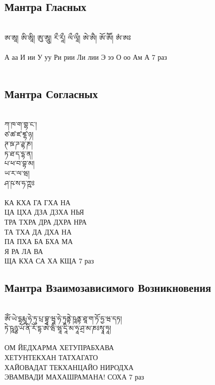 \subsection*{Мантра Гласных}
\\
\ti
ཨ་ཨཱ། ཨི་ཨཱི། ཨུ་ཨཱུ། རྀ་རཱྀ། ལྀ་ལཱྀ། ཨེ་ཨཻ། ཨོ་ཨཽ། ཨཾ་ཨཿ\\
\\
\ru
А аа И ии У уу Ри рии Ли лии Э ээ О оо Ам А \hspace{1cm} 7 раз\\
\\
\subsection*{Мантра Согласных}
\\
\ti
ཀ་ཁ་ག་གྷ་ང་། \\
ཙ་ཚ་ཛ་ཛྷ་ཉ། \\
ཊ་ཋ་ཌ་ཌྷ་ཎ། \\
ཏ་ཐ་ད་དྷ་ན། \\
པ་ཕ་བ་བྷ་མ། \\
ཡ་ར་ལ་ཝ། \\
ཤ་ཥ་ས་ཧ་ཀྵཿ \\
\\
\ru
КА  КХА  ГА ГХА НА\\
ЦА  ЦХА  ДЗА ДЗХА НЬЯ\\
ТРА ТХРА ДРА ДХРА НРА\\
ТА  ТХА  ДА ДХА НА\\
ПА  ПХА  БА БХА МА\\
Я   РА   ЛА ВА\\
ЩА  КХА  СА ХА КЩА \hspace{1cm} 7 раз\\
\newpage
\subsection*{Мантра Взаимозависимого Возникновения}
\\
\ti
ཨོཾ་ཡེ་དྷརྨཱ་ཧེ་ཏུ་པྲ་བྷཱ་ཝཱ་ཧེ་ཏུནྟེ་ཥཱནྟ་ཐཱ་ག་ཏོ་ཧྱ་ཝ་དཏ།\\
 ཏེ་ཥཱཉྩ་ཡོ་ནི་རོ་དྷ་ཨེ་ཝྃ་ཝཱ་དཱི་མ་ཧཱ་ཤྲ་མ་ཎཿསྭཱ་ཧཱ།\\
 \\
\ru
ОМ  ЙЕДХАРМА  ХЕТУПРАБХАВА\\
ХЕТУНТЕКХАН ТАТХАГАТО\\
ХАЙОВАДАТ ТЕКХАНЦАЙО НИРОДХА\\
ЭВАМВАДИ МАХАШРАМАНА! СОХА \hspace{1cm} 7 раз\\

